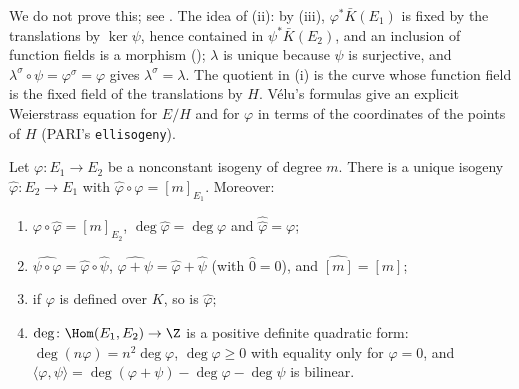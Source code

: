 \noindent We do not prove this; see \cite[Section III.4 and Exercise 3.13]{SilvermanAEC}. The idea of (ii): by (iii),
$\varphi^*\bar K(E_1)$ is fixed by the translations by $\ker\psi$, hence contained in $\psi^*\bar K(E_2)$, and an inclusion of function fields is a morphism
(); $\lambda$ is unique because $\psi$ is surjective, and $\lambda^\sigma\circ\psi=\varphi^\sigma=\varphi$ gives $\lambda^\sigma=\lambda$. The quotient in (i)
is the curve whose function field is the fixed field of the translations by $H$. V\'elu's formulas \cite{Velu71} give an explicit Weierstrass equation
for $E/H$ and for $\varphi$ in terms of the coordinates of the points of $H$ (PARI's \texttt{ellisogeny}).

\begin{theorem}\label{thm:ellcurves:dual}
Let $\varphi\colon E_1\to E_2$ be a nonconstant isogeny of degree $m$. There is a unique isogeny $\hat\varphi\colon E_2\to E_1$ with
$\hat\varphi\circ\varphi=[m]_{E_1}$. Moreover:
\begin{enumerate}[label=(\roman*)]
\item $\varphi\circ\hat\varphi=[m]_{E_2}$, $\deg\hat\varphi=\deg\varphi$ and $\hat{\hat\varphi}=\varphi$;
\item $\widehat{\psi\circ\varphi}=\hat\varphi\circ\hat\psi$, $\widehat{\varphi+\psi}=\hat\varphi+\hat\psi$ (with $\hat0=0$), and $\widehat{[m]}=[m]$;
\item if $\varphi$ is defined over $K$, so is $\hat\varphi$;
\item $\deg\colon\Hom(E_1,E_2)\to\Z$ is a positive definite quadratic form: $\deg(n\varphi)=n^2\deg\varphi$, $\deg\varphi\ge0$ with equality only for $\varphi=0$, and
$\langle\varphi,\psi\rangle=\deg(\varphi+\psi)-\deg\varphi-\deg\psi$ is bilinear.
\end{enumerate}
\end{theorem}


